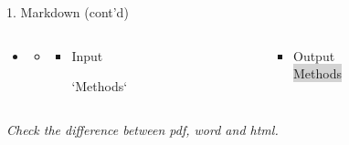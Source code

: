 \documentclass[14pt, aspectratio=169, sectionpage=simple, xclolor=table]{beamer}
\begin{document}
\begin{frame}[fragile, t]{1. Markdown (cont'd)}
\begin{itemize}
  
\item {}
\begin{itemize}
\item[] 

\begin{columns}
\begin{column}{0.45\textwidth}
\vspace{1cm}
\begin{itemize}
\item Input
\\
\begin{code11}
`Methods`
\end{code11}
\end{itemize}
\end{column}%
\hfill
\begin{column}{0.45\textwidth}
\vspace{0.9cm}
\begin{itemize}
\item Output
\\
\colorbox{lightgray}{Methods}
\end{itemize}
\end{column}%
\end{columns}

\end{itemize}
\end{itemize}
\textit{Check the difference between pdf, word and html.}
\end{frame}
\end{document}
